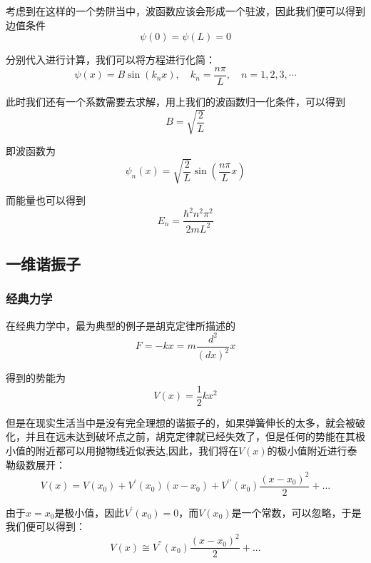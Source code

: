 \documentclass{article}
\begin{document}
考虑到在这样的一个势阱当中，波函数应该会形成一个驻波，因此我们便可以得到边值条件
\[
	\psi(0)=\psi(L)=0
\]

分别代入进行计算，我们可以将方程进行化简：
\[
	\psi(x)=B\sin(k_nx),\quad k_n = \frac{n\pi}{L},\quad n=1,2,3,\cdots
\]

此时我们还有一个系数需要去求解，用上我们的波函数归一化条件，可以得到
\[
	B=\sqrt{\frac{2}{L}}
\]

即波函数为
\[
	\psi_n(x)=\sqrt{\frac{2}{L}}\sin\left(\frac{n\pi}{L}x\right)
\]

而能量也可以得到
\[
	E_n=\frac{\hbar^2n^2\pi^2}{2mL^2}
\]


\subsection{一维谐振子}

\subsubsection{经典力学}
在经典力学中，最为典型的例子是胡克定律所描述的
\[F=-kx=m\frac{d^2}{(dx)^2}x\]

得到的势能为
\[V(x)=\frac{1}{2}kx^2\]

但是在现实生活当中是没有完全理想的谐振子的，如果弹簧伸长的太多，就会被破化，并且在远未达到破坏点之前，胡克定律就已经失效了，但是任何的势能在其极小值的附近都可以用抛物线近似表达,因此，我们将在$V(x)$的极小值附近进行泰勒级数展开：
\[
	V(x)=V(x_0)+V^\prime(x_0)(x-x_0)+V^{\prime\prime}(x_0)\frac{(x-x_0)^2}{2}+...
\]

由于$x=x_0$是极小值，因此$V^\prime(x_0)=0$，而$V(x_0)$是一个常数，可以忽略，于是我们便可以得到：
\[
	V(x)\cong V^{''}(x_0)\frac{(x-x_0)^2}{2}+...
\]
\begin{figure}[hbtp]
	\centering
\end{figure}
\end{document}
